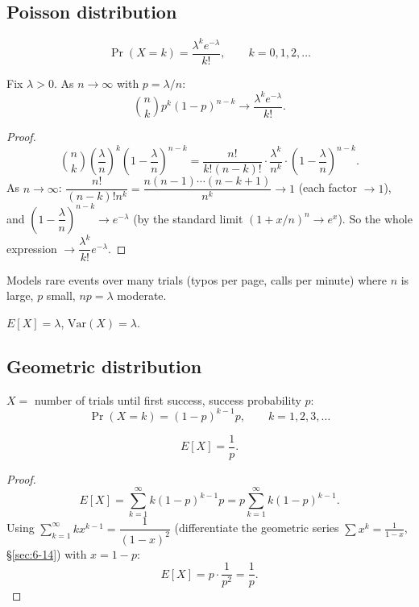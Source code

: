 \documentclass[11pt]{article}
\begin{document}
\subsection{Poisson distribution}
\label{sec:10-9}

\begin{definition}
\[
\Pr(X=k) = \frac{\lambda^k e^{-\lambda}}{k!}, \qquad k=0,1,2,\dots
\]
\end{definition}

\begin{theorem}
Fix $\lambda>0$. As $n\to\infty$ with $p=\lambda/n$:
\[
\binom{n}{k}p^k(1-p)^{n-k} \to \frac{\lambda^k e^{-\lambda}}{k!}.
\]
\end{theorem}
\begin{proof}
\[
\binom{n}{k}\left(\frac\lambda n\right)^k\left(1-\frac\lambda n\right)^{n-k} = \frac{n!}{k!(n-k)!}\cdot\frac{\lambda^k}{n^k}\cdot\left(1-\frac\lambda n\right)^{n-k}.
\]
As $n\to\infty$: $\dfrac{n!}{(n-k)!n^k} = \dfrac{n(n-1)\cdots(n-k+1)}{n^k}\to1$ (each factor $\to1$), and $\left(1-\dfrac\lambda n\right)^{n-k}\to e^{-\lambda}$ (by the standard limit $(1+x/n)^n\to e^x$). So the whole expression $\to \dfrac{\lambda^k}{k!}e^{-\lambda}$.
\end{proof}

\begin{note}
Models rare events over many trials (typos per page, calls per minute) where $n$ is large, $p$ small, $np=\lambda$ moderate.
\end{note}

\begin{theorem}
$E[X]=\lambda$, $\mathrm{Var}(X)=\lambda$.
\end{theorem}

\subsection{Geometric distribution}
\label{sec:10-10}

\begin{definition}
$X=$ number of trials until first success, success probability $p$:
\[
\Pr(X=k) = (1-p)^{k-1}p, \qquad k=1,2,3,\dots
\]
\end{definition}

\begin{theorem}
\[
E[X] = \frac1p.
\]
\end{theorem}
\begin{proof}
\[
E[X] = \sum_{k=1}^\infty k(1-p)^{k-1}p = p\sum_{k=1}^\infty k(1-p)^{k-1}.
\]
Using $\sum_{k=1}^\infty kx^{k-1} = \dfrac{1}{(1-x)^2}$ (differentiate the geometric series $\sum x^k=\frac1{1-x}$, \S\ref{sec:6-14}) with $x=1-p$:
\[
E[X] = p\cdot\frac{1}{p^2} = \frac1p.
\]
\end{proof}
\end{document}

